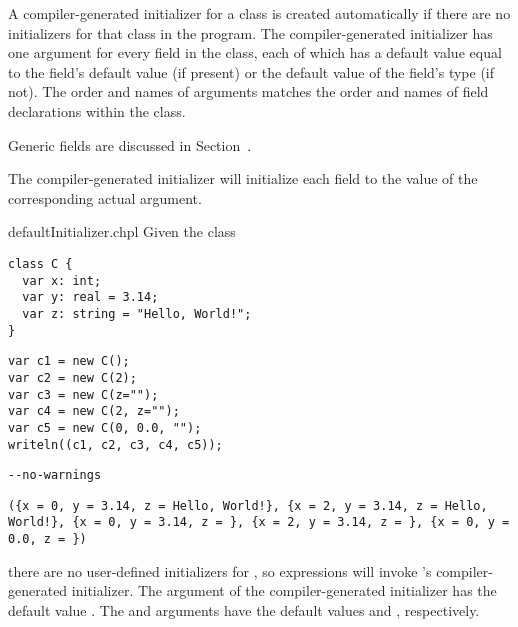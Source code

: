 A compiler-generated initializer for a class is created automatically if there
are no initializers for that class in the program. The compiler-generated
initializer has one argument for every field in the class, each of which has a
default value equal to the field's default value (if present) or the default
value of the field's type (if not). The order and names of arguments matches
the order and names of field declarations within the class.

Generic fields are discussed in Section~.

The compiler-generated initializer will initialize each field to the value of
the corresponding actual argument.

\begin{chapelexample}{defaultInitializer.chpl}
Given the class
\begin{chapel}
\begin{verbatim}
class C {
  var x: int;
  var y: real = 3.14;
  var z: string = "Hello, World!";
}
\end{verbatim}
\end{chapel}
\begin{chapelpost}
\begin{verbatim}
var c1 = new C();
var c2 = new C(2);
var c3 = new C(z="");
var c4 = new C(2, z="");
var c5 = new C(0, 0.0, "");
writeln((c1, c2, c3, c4, c5));
\end{verbatim}
\end{chapelpost}
\begin{chapelcompopts}
\begin{verbatim}
--no-warnings
\end{verbatim}
\end{chapelcompopts}
\begin{chapeloutput}
\begin{verbatim}
({x = 0, y = 3.14, z = Hello, World!}, {x = 2, y = 3.14, z = Hello, World!}, {x = 0, y = 3.14, z = }, {x = 2, y = 3.14, z = }, {x = 0, y = 0.0, z = })
\end{verbatim}
\end{chapeloutput}
there are no user-defined initializers for , so  expressions
will invoke 's compiler-generated initializer. The  argument
of the compiler-generated initializer has the default value .
The  and  arguments have the default values  and
, respectively.


\end{chapelexample}
